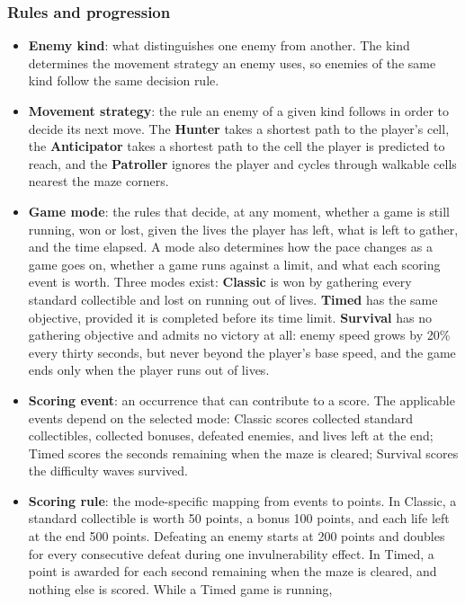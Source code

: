 \subsubsection{Rules and progression}

\begin{itemize}
  \item \textbf{Enemy kind}: what distinguishes one enemy from another. The kind determines the movement strategy
  an enemy uses, so enemies of the same kind follow the same decision rule.
  \item \textbf{Movement strategy}: the rule an enemy of a given kind follows in order to decide its next move.
  The \textbf{Hunter} takes a shortest path to the player's cell, the \textbf{Anticipator} takes a shortest path to
  the cell the player is predicted to reach, and the \textbf{Patroller} ignores the player and cycles through
  walkable cells nearest the maze corners.
  \item \textbf{Game mode}: the rules that decide, at any moment, whether a game is still running, won or lost,
  given the lives the player has left, what is left to gather, and the time elapsed. A mode also
  determines how the pace changes as a game goes on, whether a game runs against a limit, and what each scoring
  event is worth. Three modes exist: \textbf{Classic} is won by gathering every standard collectible and lost on running
  out of lives. \textbf{Timed} has the same objective, provided it is completed before its time limit.
  \textbf{Survival} has no gathering objective and admits no victory at all: enemy speed grows by 20\% every
  thirty seconds, but never beyond the player's base speed, and the game ends only when the player runs out of lives.
  \item \textbf{Scoring event}: an occurrence that can contribute to a score. The applicable events depend on the
  selected mode: Classic scores collected standard collectibles, collected bonuses, defeated enemies, and lives left at
  the end; Timed scores the seconds remaining when the maze is cleared; Survival scores the difficulty waves survived.
  \item \textbf{Scoring rule}: the mode-specific mapping from events to points. In Classic, a standard collectible is worth
  50 points, a bonus 100 points, and each life left at the end 500 points. Defeating an enemy starts at
  200 points and doubles for every consecutive defeat during one invulnerability effect. In Timed, a point is awarded
  for each second remaining when the maze is cleared, and nothing else is scored. While a Timed game is running,

\end{itemize}
